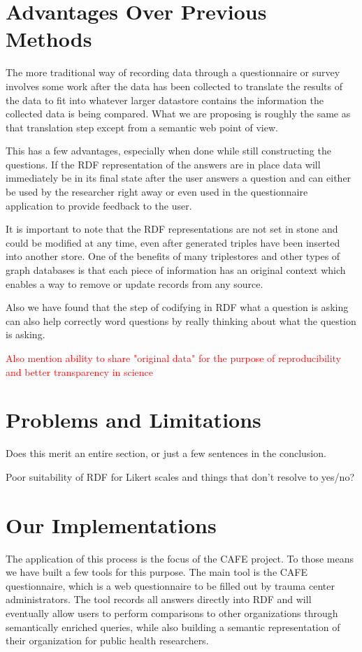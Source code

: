 \documentclass{amia}
\begin{document}
\section*{Advantages Over Previous Methods}
The more traditional way of recording data through a questionnaire or survey involves some work after the data has been collected to translate the results of the data to fit into whatever larger datastore contains the information the collected data is being compared.  What we are proposing is roughly the same as that translation step except from a semantic web point of view.

This has a few advantages, especially when done while still constructing the questions.  If the RDF representation of the answers are in place data will immediately be in its final state after the user answers a question and can either be used by the researcher right away or even used in the questionnaire application to provide feedback to the user.

It is important to note that the RDF representations are not set in stone and could be modified at any time, even after generated triples have been inserted into another store.  One of the benefits of many triplestores and other types of graph databases is that each piece of information has an original context which enables a way to remove or update records from any source.

Also we have found that the step of codifying in RDF what a question is asking can also help correctly word questions by really thinking about what the question is asking.

\textcolor{red}{Also mention ability to share "original data" for the purpose of reproducibility and better transparency in science}

\section*{Problems and Limitations}
Does this merit an entire section, or just a few sentences in the conclusion.

Poor suitability of RDF for Likert scales and things that don't resolve to yes/no?

\section*{Our Implementations}
The application of this process is the focus of the CAFE project.
To those means we have built a few tools for this purpose.
The main tool is the CAFE questionnaire, which is a web questionnaire to be filled out by trauma center administrators.
The tool records all answers directly into RDF and will eventually allow users to perform comparisons to other organizations through semantically enriched queries, while also building a semantic representation of their organization for public health researchers.
\end{document}

